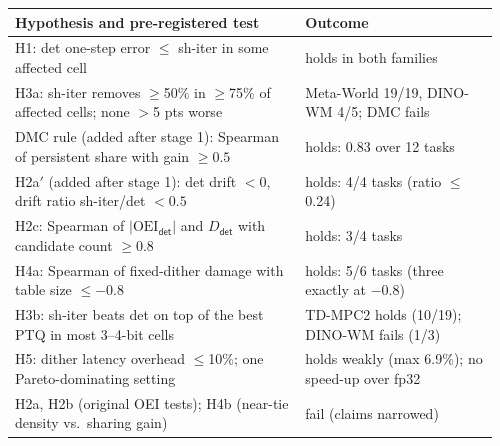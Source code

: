 \documentclass[nouppercase]{kaia}
\newcommand{\shiter}{\textsf{sh-iter}}
\newcommand{\dtm}{\textsf{det}}
\begin{document}
\begin{mdframed}
\begin{center}
\footnotesize
\setlength{\tabcolsep}{5pt}
\begin{tabular}{@{}p{0.58\linewidth}>{\raggedright\arraybackslash}p{0.38\linewidth}@{}}
\toprule
Hypothesis and pre-registered test & Outcome \\
\midrule
H1: \dtm{} one-step error $\le$ \shiter{} in some affected cell & holds in both families \\
H3a: \shiter{} removes $\ge$50\% in $\ge$75\% of affected cells; none $>$5 pts worse & Meta-World 19/19, DINO-WM 4/5; DMC fails \\
DMC rule (added after stage 1): Spearman of persistent share with gain $\ge0.5$ & holds: 0.83 over 12 tasks \\
H2a$'$ (added after stage 1): \dtm{} drift $<0$, drift ratio \shiter/\dtm{} $<0.5$ & holds: 4/4 tasks (ratio $\le$0.24) \\
H2c: Spearman of $|\mathrm{OEI}_{\dtm}|$ and $D_{\dtm}$ with candidate count $\ge0.8$ & holds: 3/4 tasks \\
H4a: Spearman of fixed-dither damage with table size $\le-0.8$ & holds: 5/6 tasks (three exactly at $-0.8$) \\
H3b: \shiter{} beats \dtm{} on top of the best PTQ in most 3--4-bit cells & TD-MPC2 holds (10/19); DINO-WM fails (1/3) \\
H5: dither latency overhead $\le$10\%; one Pareto-dominating setting & holds weakly (max 6.9\%); no speed-up over fp32 \\
H2a, H2b (original OEI tests); H4b (near-tie density vs.\ sharing gain) & fail (claims narrowed) \\
\bottomrule
\end{tabular}
\label{tab:hyp}
\end{center}

\par\vspace{3pt}

\end{mdframed}
\end{document}
